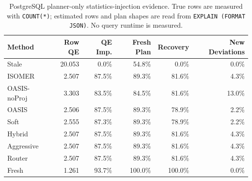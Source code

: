 \begin{table}[t]
  \centering
  \small
  \caption{PostgreSQL planner-only statistics-injection evidence. True rows are measured with \texttt{COUNT(*)}; estimated rows and plan shapes are read from \texttt{EXPLAIN (FORMAT JSON)}. No query runtime is measured.}
  \label{tab:postgres_planner_stats_injection}
  \setlength{\tabcolsep}{4pt}
  \begin{tabular}{lrrrrr}
    \toprule
    Method & Row QE & QE Imp. & Fresh Plan & Recovery & New Deviations \\
    \midrule
    Stale & 20.053 & 0.0\% & 54.8\% & 0.0\% & 0.0\% \\
    ISOMER & 2.507 & 87.5\% & 89.3\% & 81.6\% & 4.3\% \\
    OASIS-noProj & 3.303 & 83.5\% & 84.5\% & 81.6\% & 13.0\% \\
    OASIS & 2.506 & 87.5\% & 89.3\% & 78.9\% & 2.2\% \\
    Soft & 2.555 & 87.3\% & 89.3\% & 78.9\% & 2.2\% \\
    Hybrid & 2.507 & 87.5\% & 89.3\% & 81.6\% & 4.3\% \\
    Aggressive & 2.507 & 87.5\% & 89.3\% & 81.6\% & 4.3\% \\
    Router & 2.507 & 87.5\% & 89.3\% & 81.6\% & 4.3\% \\
    Fresh & 1.261 & 93.7\% & 100.0\% & 100.0\% & 0.0\% \\
    \bottomrule
  \end{tabular}
\end{table}
